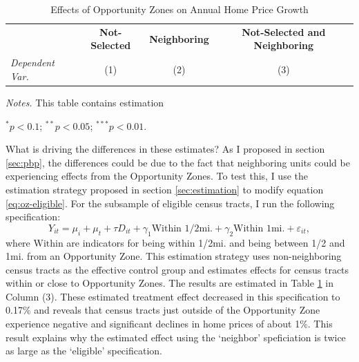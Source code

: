 \documentclass[11pt]{article}
\begin{document}
\begin{table}[!tb]
    \caption{Effects of Opportunity Zones on Annual Home Price Growth}
    \label{tab:oz}
    \renewcommand{\arraystretch}{1.1}

    \begin{adjustbox}{width = 0.8\textwidth, center}
        \begin{threeparttable}
            \begin{tabular}{@{} l ccc @{}}
                \toprule

                & \multicolumn{1}{c}{\textbf{Not-Selected}} & \multicolumn{1}{c}{\textbf{Neighboring}} & \multicolumn{1}{c}{\textbf{Not-Selected and Neighboring}} \\ 
                \textit{Dependent Var.} & (1) & (2) & (3) \\
                
 
                \midrule
                
                

                \bottomrule
            \end{tabular}
            
            \begin{tablenotes}\footnotesize
                \item \textit{Notes.} This table contains estimation 
                \item $^{*} p< 0.1$; $^{**} p < 0.05$; $^{***} p < 0.01$.
            \end{tablenotes}
        \end{threeparttable}
    \end{adjustbox}
\end{table}

What is driving the differences in these estimates? As I proposed in section \ref{sec:pbp}, the differences could be due to the fact that neighboring units could be experiencing effects from the Opportunity Zones. To test this, I use the estimation strategy proposed in section \ref{sec:estimation} to modify equation \ref{eq:oz-eligible}. For the subsample of eligible census tracts, I run the following specification: 
\begin{equation}\label{eq:oz-spill}
    Y_{it} = \mu_i + \mu_t + \tau D_{it} + \gamma_{1} \text{Within 1/2mi.} +  \gamma_{2} \text{Within 1mi.} + \varepsilon_{it},
\end{equation}
where $\text{Within}$ are indicators for being within 1/2mi. and being between 1/2 and 1mi. from an Opportunity Zone. This estimation strategy uses non-neighboring census tracts as the effective control group and estimates effects for census tracts within or close to Opportunity Zones. The results are estimated in Table \ref{tab:oz} in Column (3). These estimated treatment effect decreased in this specification to 0.17\% and reveals that census tracts just outside of the Opportunity Zone experience negative and significant declines in home prices of about 1\%. This result explains why the estimated effect using the `neighbor' speficiation is twice as large as the `eligible' specification. 
\end{document}
